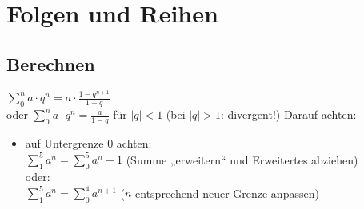 \newcommand{\customDir}{../}








%
\makeatletter
\renewcommand\tableofcontents{%
}
\makeatother



\tableofcontents
\newpage

\chapter{Folgen und Reihen}
\section{Berechnen}
$\sum_0^n a \cdot q^n=a\cdot \frac{1-q^{n+1}}{1-q}$\\
oder $\sum_0^n a \cdot q^n=\frac{a}{1-q}$ für $|q|<1$ (bei $|q|>1$: divergent!)
Darauf achten:
\begin{itemize}
\item auf Untergrenze $0$ achten:\\
$\sum_1^5 a^n = \sum_0^5 a^n -1$ (Summe „erweitern“ und Erweitertes abziehen)\\
oder:\\
$\sum_1^5 a^n = \sum_0^4 a^{n+1}$ ($n$ entsprechend neuer Grenze anpassen)
\end{itemize}
